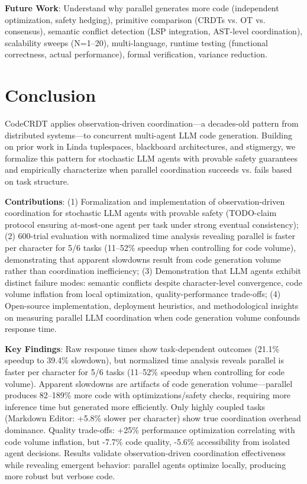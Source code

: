 \documentclass{article}
\begin{document}
\textbf{Future Work}: Understand why parallel generates more code (independent optimization, safety hedging), primitive comparison (CRDTs vs. OT vs. consensus), semantic conflict detection (LSP integration, AST-level coordination), scalability sweeps (N=1--20), multi-language, runtime testing (functional correctness, actual performance), formal verification, variance reduction.

\section{Conclusion}
\label{sec:conclusion}

CodeCRDT applies observation-driven coordination---a decades-old pattern from distributed systems---to concurrent multi-agent LLM code generation. Building on prior work in Linda tuplespaces, blackboard architectures, and stigmergy, we formalize this pattern for stochastic LLM agents with provable safety guarantees and empirically characterize when parallel coordination succeeds vs. fails based on task structure.

\textbf{Contributions}: (1) Formalization and implementation of observation-driven coordination for stochastic LLM agents with provable safety (TODO-claim protocol ensuring at-most-one agent per task under strong eventual consistency); (2) 600-trial evaluation with normalized time analysis revealing parallel is faster per character for 5/6 tasks (11--52\% speedup when controlling for code volume), demonstrating that apparent slowdowns result from code generation volume rather than coordination inefficiency; (3) Demonstration that LLM agents exhibit distinct failure modes: semantic conflicts despite character-level convergence, code volume inflation from local optimization, quality-performance trade-offs; (4) Open-source implementation, deployment heuristics, and methodological insights on measuring parallel LLM coordination when code generation volume confounds response time.

\textbf{Key Findings}: Raw response times show task-dependent outcomes (21.1\% speedup to 39.4\% slowdown), but normalized time analysis reveals parallel is faster per character for 5/6 tasks (11--52\% speedup when controlling for code volume). Apparent slowdowns are artifacts of code generation volume---parallel produces 82--189\% more code with optimizations/safety checks, requiring more inference time but generated more efficiently. Only highly coupled tasks (Markdown Editor: +5.8\% slower per character) show true coordination overhead dominance. Quality trade-offs: +25\% performance optimization correlating with code volume inflation, but -7.7\% code quality, -5.6\% accessibility from isolated agent decisions. Results validate observation-driven coordination effectiveness while revealing emergent behavior: parallel agents optimize locally, producing more robust but verbose code.
\end{document}
